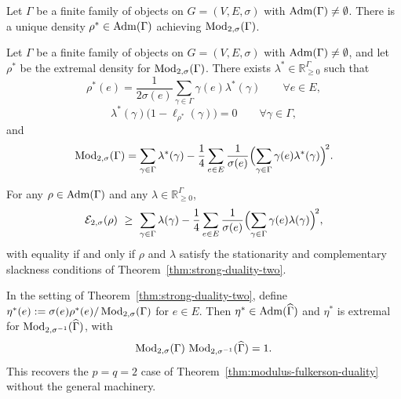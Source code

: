 \begin{theorem}
\label{thm:extremal-unique-two}
Let $\Gamma$ be a finite family of objects on $G = (V, E, \sigma)$ with
$\operatorname{Adm}(\Gamma) \ne \emptyset$. There is a unique density $\rho^* \in
\operatorname{Adm}(\Gamma)$ achieving $\operatorname{Mod}_{2,\sigma}(\Gamma)$.
\end{theorem}

\begin{theorem}
\label{thm:strong-duality-two}
Let $\Gamma$ be a finite family of objects on $G = (V, E, \sigma)$ with
$\operatorname{Adm}(\Gamma) \ne \emptyset$, and let $\rho^*$ be the extremal density for
$\operatorname{Mod}_{2,\sigma}(\Gamma)$. There exists $\lambda^* \in \mathbb R_{\ge
0}^\Gamma$ such that
\[
  \rho^*(e) = \frac{1}{2\sigma(e)} \sum_{\gamma \in \Gamma} \gamma(e)
  \lambda^*(\gamma) \qquad \forall e \in E,
\]
\[
  \lambda^*(\gamma) \bigl(1 - \ell_{\rho^*}(\gamma)\bigr) = 0 \qquad \forall
  \gamma \in \Gamma,
\]
and
\[
  \operatorname{Mod}_{2,\sigma}(\Gamma) = \sum_{\gamma \in \Gamma} \lambda^*(\gamma) -
  \frac14 \sum_{e \in E} \frac{1}{\sigma(e)} \Bigl(\sum_{\gamma \in \Gamma}
  \gamma(e) \lambda^*(\gamma)\Bigr)^{\!2}.
\]
\end{theorem}

\begin{corollary}
\label{cor:weak-duality-two}
For any $\rho \in \operatorname{Adm}(\Gamma)$ and any $\lambda \in \mathbb R_{\ge
0}^\Gamma$,
\[
  \mathcal{E}_{2,\sigma}(\rho) \ \ge\ \sum_{\gamma \in \Gamma} \lambda(\gamma) -
  \frac14 \sum_{e \in E} \frac{1}{\sigma(e)} \Bigl(\sum_{\gamma \in \Gamma}
  \gamma(e) \lambda(\gamma)\Bigr)^{\!2},
\]
with equality if and only if $\rho$ and $\lambda$ satisfy the stationarity
and complementary slackness conditions of
Theorem~\ref{thm:strong-duality-two}.
\end{corollary}

\begin{corollary}
\label{cor:fulkerson-duality-two}
In the setting of Theorem~\ref{thm:strong-duality-two}, define $\eta^*(e) :=
\sigma(e) \rho^*(e) / \operatorname{Mod}_{2,\sigma}(\Gamma)$ for $e \in E$. Then $\eta^*
\in \operatorname{Adm}(\widehat\Gamma)$ and $\eta^*$ is extremal for
$\operatorname{Mod}_{2,\sigma^{-1}}(\widehat\Gamma)$, with
\[
  \operatorname{Mod}_{2,\sigma}(\Gamma) \, \operatorname{Mod}_{2,\sigma^{-1}}(\widehat\Gamma) = 1.
\]
This recovers the $p = q = 2$ case of
Theorem~\ref{thm:modulus-fulkerson-duality} without the general machinery.
\end{corollary}

